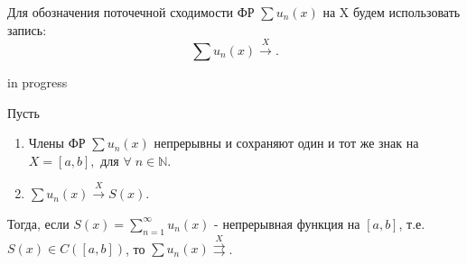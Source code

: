 \begin{col-answer-preambule}
	Для обозначения поточечной сходимости ФР $\sum u_n(x)$ на X будем использовать запись:
	\begin{equation}
	\label{eq:lecture01-14}
	\sum u_n(x) \overset{X}{\rightarrow}.
	\end{equation}
	\begin{plan}
	\item in progress
	\end{plan}
\end{col-answer-preambule}
\begin{theorem}
	Пусть
	\begin{enumerate}
		\item Члены ФР $\sum u_n(x)$ непрерывны и сохраняют один и тот же знак на $X = [a, b], \text{ для } \forall \; n \in \mathbb{N}$.
		\item $\sum u_n(x) \overset{X}{\to} S(x)$.
	\end{enumerate}
	Тогда, если $S(x) = \sum\limits_{n=1}^{\infty} u_n (x)$ - непрерывная функция на $[a, b]$, т.е. $S(x) \in C([a, b])$, то $\sum u_n(x) \overset{X}{\rightrightarrows}$.
\end{theorem}
